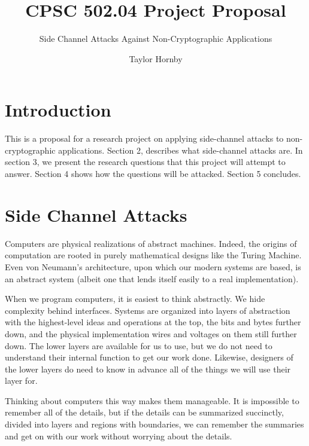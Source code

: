 \documentclass{acm_proc_article-sp}
\begin{document}
\title{CPSC 502.04 Project Proposal}
\subtitle{Side Channel Attacks Against Non-Cryptographic Applications}


\author{
\alignauthor
Taylor Hornby
}

\maketitle

\section{Introduction}

This is a proposal for a research project on applying side-channel attacks to
non-cryptographic applications. Section 2, describes what side-channel attacks
are. In section 3, we present the research questions that this project will
attempt to answer. Section 4 shows how the questions will be attacked. Section
5 concludes.


\section{Side Channel Attacks}

Computers are physical realizations of abstract machines. Indeed, the origins of
computation are rooted in purely mathematical designs like the Turing Machine.
Even von Neumann's architecture, upon which our modern systems are based, is an
abstract system (albeit one that lends itself easily to a real implementation).

When we program computers, it is easiest to think abstractly. We hide complexity
behind interfaces. Systems are organized into layers of abstraction with the
highest-level ideas and operations at the top, the bits and bytes further down,
and the physical implementation \textendash wires and voltages on them
\textendash still further down. The lower layers are available for us to use,
but we do not need to understand their internal function to get our work done.
Likewise, designers of the lower layers do need to know in advance all of the
things we will use their layer for.

Thinking about computers this way makes them manageable. It is impossible to
remember all of the details, but if the details can be summarized succinctly,
divided into layers and regions with boundaries, we can remember the summaries
and get on with our work without worrying about the details.
\end{document}
